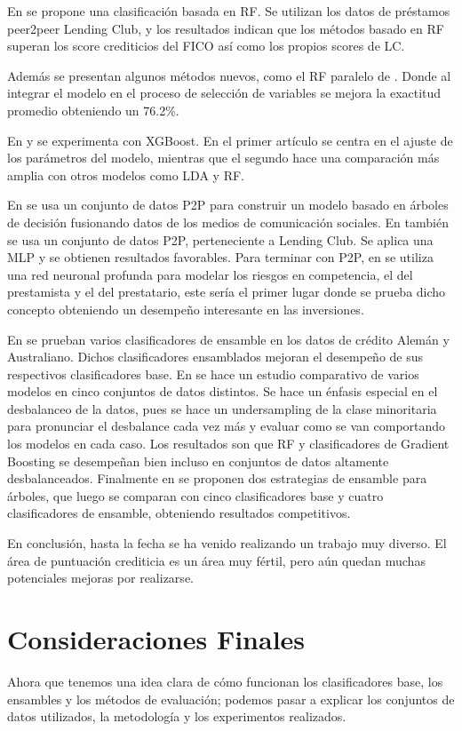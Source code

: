 En \cite{malekipirbazari2015risk} se propone una clasificación basada en \ac{RF}. Se utilizan los datos de préstamos peer2peer Lending Club, y los resultados indican que los métodos basado en \ac{RF} superan los score crediticios del FICO así como los propios scores de LC.

Además se presentan algunos métodos nuevos, como el \ac{RF} paralelo de \cite{van2016novel}. Donde al integrar el modelo en el proceso de selección de variables se mejora la exactitud promedio obteniendo un 76.2\%.

En \cite{xia2017boosted} y \cite{bhatia2017credit} se experimenta con \ac{XGBoost}. En el primer artículo se centra en el ajuste de los parámetros del modelo, mientras que el segundo hace una comparación más amplia con otros modelos como \ac{LDA} y \ac{RF}.

En \cite{zhang2016research} se usa un conjunto de datos P2P para construir un modelo basado en árboles de decisión fusionando datos de los medios de comunicación sociales. En \cite{zang2014credit} también se usa un conjunto de datos P2P, perteneciente a Lending Club. Se aplica una \ac{MLP} y se obtienen resultados favorables. Para terminar con P2P, en \cite{tan2018deep} se utiliza una red neuronal profunda para modelar los riesgos en competencia, el del prestamista y el del prestatario, este sería el primer lugar donde se prueba dicho concepto obteniendo un desempeño interesante en las inversiones.

En \cite{nanni2009experimental} se prueban varios clasificadores de ensamble en los datos de crédito Alemán y Australiano. Dichos clasificadores ensamblados mejoran el desempeño de sus respectivos clasificadores base. En \cite{brown2012experimental} se hace un estudio comparativo de varios modelos en cinco conjuntos de datos distintos. Se hace un énfasis especial en el desbalanceo de la datos, pues se hace un undersampling de la clase minoritaria para pronunciar el desbalance cada vez más y evaluar como se van comportando los modelos en cada caso. Los resultados son que \ac{RF} y clasificadores de Gradient Boosting se desempeñan bien incluso en conjuntos de datos altamente desbalanceados. Finalmente en \cite{wang2012two} se proponen dos estrategias de ensamble para árboles, que luego se comparan con cinco clasificadores base y cuatro clasificadores de ensamble, obteniendo resultados competitivos.

En conclusión, hasta la fecha se ha venido realizando un trabajo muy diverso. El área de puntuación crediticia es un área muy fértil, pero aún quedan muchas potenciales mejoras por realizarse.

\section{Consideraciones Finales}

Ahora que tenemos una idea clara de cómo funcionan los clasificadores base, los ensambles y los métodos de evaluación; podemos pasar a explicar los conjuntos de datos utilizados, la metodología y los experimentos realizados.
